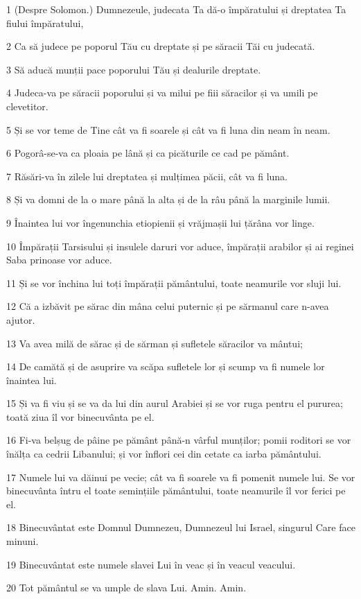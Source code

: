 \par 1 (Despre Solomon.) Dumnezeule, judecata Ta dă-o împăratului și dreptatea Ta fiului împăratului,
\par 2 Ca să judece pe poporul Tău cu dreptate și pe săracii Tăi cu judecată.
\par 3 Să aducă munții pace poporului Tău și dealurile dreptate.
\par 4 Judeca-va pe săracii poporului și va milui pe fiii săracilor și va umili pe clevetitor.
\par 5 Și se vor teme de Tine cât va fi soarele și cât va fi luna din neam în neam.
\par 6 Pogorâ-se-va ca ploaia pe lână și ca picăturile ce cad pe pământ.
\par 7 Răsări-va în zilele lui dreptatea și mulțimea păcii, cât va fi luna.
\par 8 Și va domni de la o mare până la alta și de la râu până la marginile lumii.
\par 9 Înaintea lui vor îngenunchia etiopienii și vrăjmașii lui țărâna vor linge.
\par 10 Împărații Tarsisului și insulele daruri vor aduce, împărații arabilor și ai reginei Saba prinoase vor aduce.
\par 11 Și se vor închina lui toți împărații pământului, toate neamurile vor sluji lui.
\par 12 Că a izbăvit pe sărac din mâna celui puternic și pe sărmanul care n-avea ajutor.
\par 13 Va avea milă de sărac și de sărman și sufletele săracilor va mântui;
\par 14 De camătă și de asuprire va scăpa sufletele lor și scump va fi numele lor înaintea lui.
\par 15 Și va fi viu și se va da lui din aurul Arabiei și se vor ruga pentru el pururea; toată ziua îl vor binecuvânta pe el.
\par 16 Fi-va belșug de pâine pe pământ până-n vârful munților; pomii roditori se vor înălța ca cedrii Libanului; și vor înflori cei din cetate ca iarba pământului.
\par 17 Numele lui va dăinui pe vecie; cât va fi soarele va fi pomenit numele lui. Se vor binecuvânta întru el toate semințiile pământului, toate neamurile îl vor ferici pe el.
\par 18 Binecuvântat este Domnul Dumnezeu, Dumnezeul lui Israel, singurul Care face minuni.
\par 19 Binecuvântat este numele slavei Lui în veac și în veacul veacului.
\par 20 Tot pământul se va umple de slava Lui. Amin. Amin.

